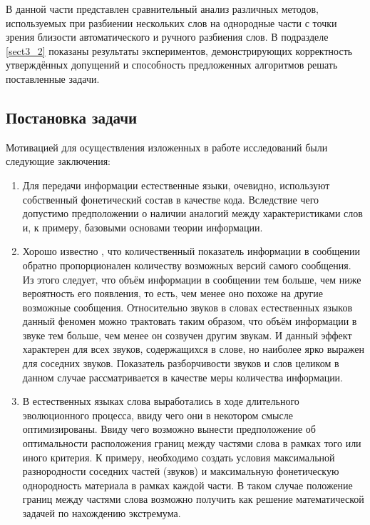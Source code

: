 В данной части представлен сравнительный анализ различных методов, используемых при разбиении нескольких слов на однородные части с точки зрения близости автоматического и ручного разбиения слов.
В подразделе \ref{sect3_2} показаны результаты экспериментов, демонстрирующих корректность утверждённых допущений и способность предложенных алгоритмов решать поставленные задачи.


\subsection{Постановка задачи} \label{sect2_2_1}

Мотивацией для осуществления изложенных в работе исследований были следующие заключения:
\begin{enumerate}[label={\arabic*)}]
	\item Для передачи информации естественные языки, очевидно, используют собственный фонетический состав в качестве кода.
	Вследствие чего допустимо предположении о наличии аналогий между характеристиками слов и, к примеру, базовыми основами теории информации.
	\item Хорошо известно \cite{stratonovich1975theory}, что количественный показатель информации в сообщении обратно пропорционален количеству возможных версий самого сообщения.
	Из этого следует, что объём информации в сообщении тем больше, чем ниже вероятность его появления, то есть, чем менее оно похоже на другие возможные сообщения.
	Относительно звуков в словах естественных языков данный феномен можно трактовать таким образом, что объём информации в звуке тем больше, чем менее он созвучен другим звукам.
	И данный эффект характерен для всех звуков, содержащихся в слове, но наиболее ярко выражен для соседних звуков.
	Показатель разборчивости звуков и слов целиком в данном случае рассматривается в качестве меры количества информации.
	\item В естественных языках слова выработались в ходе длительного эволюционного процесса, ввиду чего они в некотором смысле оптимизированы.
	Ввиду чего возможно вынести предположение об оптимальности расположения границ между частями слова в рамках того или иного критерия.
	К примеру, необходимо создать условия максимальной разнородности соседних частей (звуков) и максимальную фонетическую однородность материала в рамках каждой части.
	В таком случае положение границ между частями слова возможно получить как решение математической задачей по нахождению экстремума.
\end{enumerate}

